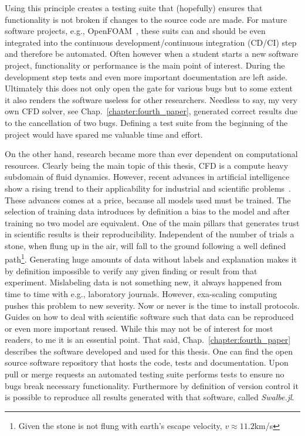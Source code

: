 Using this principle creates a testing suite that (hopefully) ensures that functionality is not broken if changes to the source code are made.
For mature software projects, e.g., OpenFOAM~\cite{jasakOpenFOAMLibraryComplex, jasakOpenFOAMOpenSource2009, chenOpenFOAMComputationalFluid2014}, these suits can and should be even integrated into the continuous development/continuous integration (CD/CI) step and therefore be automated.
Often however when a student starts a new software project, functionality or performance is the main point of interest.
During the development step tests and even more important documentation are left aside.
Ultimately this does not only open the gate for various bugs but to some extent it also renders the software useless for other researchers.
Needless to say, my very own CFD solver, see Chap.~\ref{chapter:fourth_paper}, generated correct results due to the cancellation of two bugs.
Defining a test suite from the beginning of the project would have spared me valuable time and effort.

On the other hand, research became more than ever dependent on computational resources.
Clearly being the main topic of this thesis, CFD is a compute heavy subdomain of fluid dynamics. 
However, recent advances in artificial intelligence show a rising trend to their applicability for industrial and scientific problems~\cite{acemogluArtificialIntelligenceAutomation2018, beintemaControllingRayleighBenard2020}.
These advances comes at a price, because all models used must be trained.
The selection of training data introduces by definition a bias to the model and after training no two model are equivalent.
One of the main pillars that generates trust in scientific results is their reproducibility.
Independent of the number of trials a stone, when flung up in the air, will fall to the ground following a well defined path\footnote{Given the stone is not flung with earth's escape velocity, $v\approx 11.2$km/s}.
Generating huge amounts of data without labels and explanation makes it by definition impossible to verify any given finding or result from that experiment.
Mislabeling data is not something new, it always happened from time to time with e.g., laboratory journals.
However, exa-scaling computing pushes this problem to new severity.
Now or never is the time to install protocols. 
Guides on how to deal with scientific software such that data can be reproduced or even more important reused.
While this may not be of interest for most readers, to me it is an essential point.
That said, Chap.~\ref{chapter:fourth_paper} describes the software developed and used for this thesis. 
One can find the open source software repository that hosts the code, tests and documentation.
Upon pull or merge requests an automated testing suite performs tests to ensure no bugs break necessary functionality.
Furthermore by definition of version control it is possible to reproduce all results generated with that software, called \textit{Swalbe.jl}.

